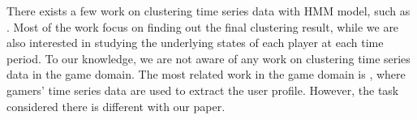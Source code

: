 There exists a few work on clustering time series data with HMM model, such as
\cite{Bicego2006,bicego2003,coviello2014}. Most of the work focus on finding
out the final clustering result, while we are also interested in studying
the underlying states of each player at each time period. To our knowledge, 
we are not aware of any work on clustering time series data in the game domain.
The most related work in the game domain is \cite{menendez2014},
where gamers' time series data are used to extract the user profile.
However, the task considered there is different with our paper.

